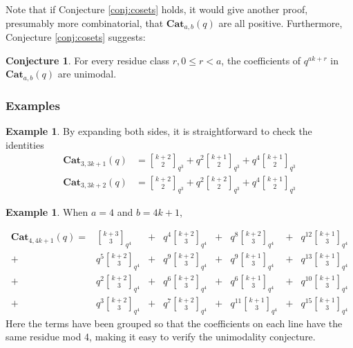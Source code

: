 \documentclass{amsart}[12pt]
\theoremstyle{definition}
\newtheorem{example}[dummy]{Example}
\newtheorem{conjecture}[dummy]{Conjecture}
\newcommand{\Cat}{\mathbf{Cat}}
\begin{document}
Note that if Conjecture \ref{conj:cosets} holds, it would give
another proof, presumably more combinatorial, that $\Cat_{a,b}(q)$ are all positive.  Furthermore, Conjecture \ref{conj:cosets} suggests:

\begin{conjecture}
For every residue class $r, 0\leq r< a$, the coefficients of $q^{ak+r}$ in $\Cat_{a,b}(q)$ are unimodal.
\end{conjecture}

\subsubsection{Examples}

\begin{example}
By expanding both sides, it is straightforward to check the identities
\begin{align*}
\Cat_{3,3k+1}(q) & ={k+2\brack 2}_{q^3}
+q^2{k+1 \brack 2}_{q^3}
+q^4{k+1\brack 2}_{q^3} \\
\Cat_{3,3k+2}(q)&=
{k+2\brack 2}_{q^3}
+q^2{k+2\brack 2}_{q^3}
+q^4{k+1\brack 2}_{q^3}
\end{align*}
\end{example}

\begin{example}
When $a=4$ and $b=4k+1$,

\begin{align*}
\Cat_{4, 4k+1}(q)=&
{k+3\brack 3}_{q^4}&+&q^4{k+2\brack 3}_{q^4}&+&q^8{k+2\brack 3}_{q^4}&+&q^{12}{k+1\brack 3}_{q^4} \\
+&q^5{k+2\brack 3}_{q^4}&+&q^9{k+2\brack 3}_{q^4}&+&q^9{k+1\brack 3}_{q^4}&+&q^{13}{k+1\brack 3}_{q^4} \\
+&q^2{k+2\brack 3}_{q^4}&+&q^6{k+2\brack 3}_{q^4}&+&q^6{k+1\brack 3}_{q^4}&+&q^{10}{k+1\brack 3}_{q^4}\\
+&q^3{k+2\brack 3}_{q^4}&+&q^7{k+2\brack 3}_{q^4}&+&q^{11}{k+1\brack 3}_{q^4}&+&q^{15}{k+1\brack 3}_{q^4}
\end{align*}
Here the terms have been grouped so that the coefficients on each line have the same residue mod 4, making it easy to verify the unimodality conjecture.







\end{example}
\end{document}
